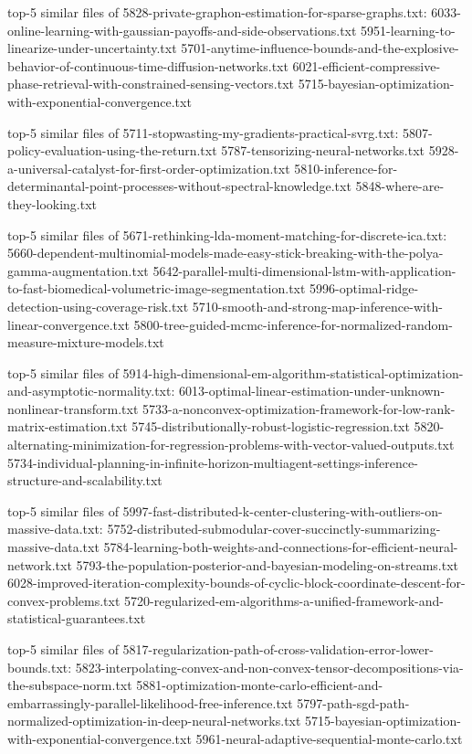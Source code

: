 \documentclass[11pt]{article}
\begin{document}
top-5 similar files of
5828-private-graphon-estimation-for-sparse-graphs.txt:
6033-online-learning-with-gaussian-payoffs-and-side-observations.txt
5951-learning-to-linearize-under-uncertainty.txt
5701-anytime-influence-bounds-and-the-explosive-behavior-of-continuous-time-diffusion-networks.txt
6021-efficient-compressive-phase-retrieval-with-constrained-sensing-vectors.txt
5715-bayesian-optimization-with-exponential-convergence.txt

top-5 similar files of 5711-stopwasting-my-gradients-practical-svrg.txt:
5807-policy-evaluation-using-the-return.txt
5787-tensorizing-neural-networks.txt
5928-a-universal-catalyst-for-first-order-optimization.txt
5810-inference-for-determinantal-point-processes-without-spectral-knowledge.txt
5848-where-are-they-looking.txt

top-5 similar files of
5671-rethinking-lda-moment-matching-for-discrete-ica.txt:
5660-dependent-multinomial-models-made-easy-stick-breaking-with-the-polya-gamma-augmentation.txt
5642-parallel-multi-dimensional-lstm-with-application-to-fast-biomedical-volumetric-image-segmentation.txt
5996-optimal-ridge-detection-using-coverage-risk.txt
5710-smooth-and-strong-map-inference-with-linear-convergence.txt
5800-tree-guided-mcmc-inference-for-normalized-random-measure-mixture-models.txt

top-5 similar files of
5914-high-dimensional-em-algorithm-statistical-optimization-and-asymptotic-normality.txt:
6013-optimal-linear-estimation-under-unknown-nonlinear-transform.txt
5733-a-nonconvex-optimization-framework-for-low-rank-matrix-estimation.txt
5745-distributionally-robust-logistic-regression.txt
5820-alternating-minimization-for-regression-problems-with-vector-valued-outputs.txt
5734-individual-planning-in-infinite-horizon-multiagent-settings-inference-structure-and-scalability.txt

top-5 similar files of
5997-fast-distributed-k-center-clustering-with-outliers-on-massive-data.txt:
5752-distributed-submodular-cover-succinctly-summarizing-massive-data.txt
5784-learning-both-weights-and-connections-for-efficient-neural-network.txt
5793-the-population-posterior-and-bayesian-modeling-on-streams.txt
6028-improved-iteration-complexity-bounds-of-cyclic-block-coordinate-descent-for-convex-problems.txt
5720-regularized-em-algorithms-a-unified-framework-and-statistical-guarantees.txt

top-5 similar files of
5817-regularization-path-of-cross-validation-error-lower-bounds.txt:
5823-interpolating-convex-and-non-convex-tensor-decompositions-via-the-subspace-norm.txt
5881-optimization-monte-carlo-efficient-and-embarrassingly-parallel-likelihood-free-inference.txt
5797-path-sgd-path-normalized-optimization-in-deep-neural-networks.txt
5715-bayesian-optimization-with-exponential-convergence.txt
5961-neural-adaptive-sequential-monte-carlo.txt
\end{document}
